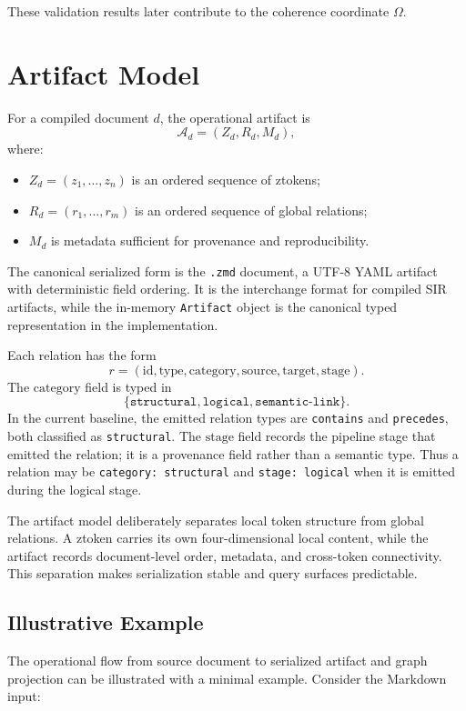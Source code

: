 \documentclass{article}
\newcommand{\SIR}{{\normalfont\textsc{SIR}}}
\begin{document}
These validation results later contribute to the coherence coordinate \(\Omega\).

\section{Artifact Model}

For a compiled document \(d\), the operational artifact is
\[
\mathcal{A}_d = (Z_d, R_d, M_d),
\]
where:
\begin{itemize}
\item \(Z_d = (z_1, \dots, z_n)\) is an ordered sequence of ztokens;
\item \(R_d = (r_1, \dots, r_m)\) is an ordered sequence of global relations;
\item \(M_d\) is metadata sufficient for provenance and reproducibility.
\end{itemize}

The canonical serialized form is the \texttt{.zmd} document, a UTF-8 YAML artifact with deterministic field ordering. It is the interchange format for compiled \SIR{} artifacts, while the in-memory \texttt{Artifact} object is the canonical typed representation in the implementation.

Each relation has the form
\[
r = (\mathrm{id}, \mathrm{type}, \mathrm{category}, \mathrm{source}, \mathrm{target}, \mathrm{stage}).
\]
The \(\mathrm{category}\) field is typed in
\[
\{\texttt{structural}, \texttt{logical}, \texttt{semantic-link}\}.
\]
In the current baseline, the emitted relation types are \texttt{contains} and \texttt{precedes}, both classified as \texttt{structural}. The \(\mathrm{stage}\) field records the pipeline stage that emitted the relation; it is a provenance field rather than a semantic type. Thus a relation may be \texttt{category: structural} and \texttt{stage: logical} when it is emitted during the logical stage.

The artifact model deliberately separates local token structure from global relations. A ztoken carries its own four-dimensional local content, while the artifact records document-level order, metadata, and cross-token connectivity. This separation makes serialization stable and query surfaces predictable.

\subsection*{Illustrative Example}

The operational flow from source document to serialized artifact and graph projection can be illustrated with a minimal example. Consider the Markdown input:
\end{document}
